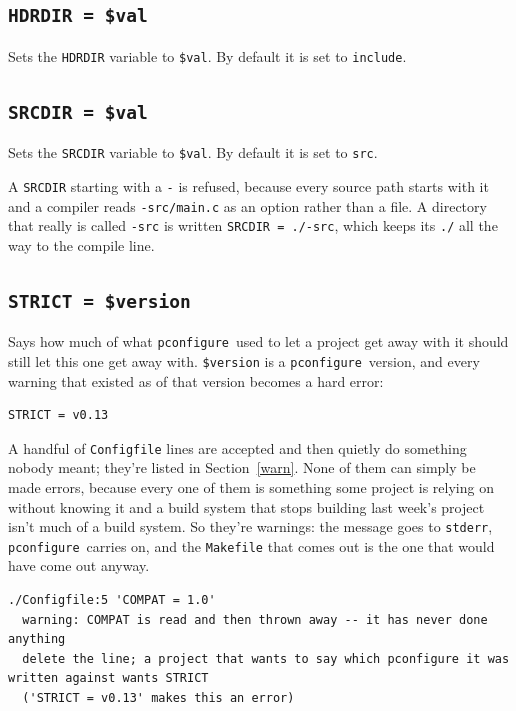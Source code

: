 \documentclass{article}
\newcommand{\pconfigure}{\texttt{pconfigure}}
\begin{document}
\subsection{\texttt{HDRDIR = \$val}}

Sets the \texttt{HDRDIR} variable to \texttt{\$val}.  By default it is
set to \texttt{include}.

\subsection{\texttt{SRCDIR = \$val}}

Sets the \texttt{SRCDIR} variable to \texttt{\$val}.  By default it is
set to \texttt{src}.

A \texttt{SRCDIR} starting with a \texttt{-} is refused, because every
source path starts with it and a compiler reads \texttt{-src/main.c}
as an option rather than a file.  A directory that really is called
\texttt{-src} is written \texttt{SRCDIR = ./-src}, which keeps its
\texttt{./} all the way to the compile line.

\subsection{\texttt{STRICT = \$version} \label{cmd:strict}}

Says how much of what \pconfigure\ used to let a project get away with
it should still let this one get away with.  \texttt{\$version} is a
\pconfigure\ version, and every warning that existed as of that
version becomes a hard error:

\begin{verbatim}
STRICT = v0.13
\end{verbatim}

A handful of \texttt{Configfile} lines are accepted and then quietly
do something nobody meant; they're listed in Section~\ref{warn}.  None
of them can simply be made errors, because every one of them is
something some project is relying on without knowing it and a build
system that stops building last week's project isn't much of a build
system.  So they're warnings: the message goes to \texttt{stderr},
\pconfigure\ carries on, and the \texttt{Makefile} that comes out is
the one that would have come out anyway.

\begin{verbatim}
./Configfile:5 'COMPAT = 1.0'
  warning: COMPAT is read and then thrown away -- it has never done anything
  delete the line; a project that wants to say which pconfigure it was written against wants STRICT
  ('STRICT = v0.13' makes this an error)
\end{verbatim}
\end{document}
